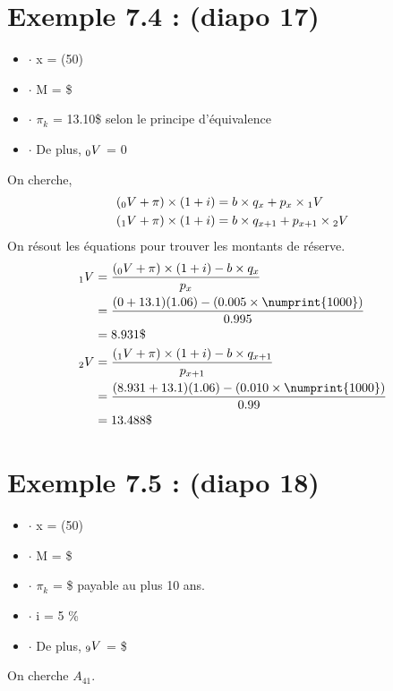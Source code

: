 \documentclass[11pt,french]{report}
\newcommand{\indiceGauche}[2]{{\vphantom{#2}}_{#1}#2}
\begin{document}
\section{Exemple 7.4 : (diapo 17)}
\begin{itemize}
\item $ \cdot $ x = (50)
\item $ \cdot $ M = \$
\item $ \cdot $ $\pi_k$ = 13.10\$ selon le principe d'équivalence 
\item $ \cdot $ De plus, $\indiceGauche{0}{V}$ = 0
\end{itemize}
On cherche,
\begin{align*}
(\indiceGauche{0}{V} + \pi )\times (1+i) &=  b\times q_{x} + p_{x}\times \indiceGauche{1}{V}\\
(\indiceGauche{1}{V} + \pi )\times (1+i) &=  b\times q_{x+1} + p_{x+1}\times \indiceGauche{2}{V}\\
\end{align*}
On résout les équations pour trouver les montants de réserve.
\begin{align*}
\indiceGauche{1}{V} &= \frac{(\indiceGauche{0}{V} + \pi )\times (1+i) - b\times q_{x}}{p_{x}}\\
&= \frac{(0 + 13.1)(1.06) - (0.005 \times \numprint{1000})}{0.995}\\
&= 8.931\$ \\
\indiceGauche{2}{V} &= \frac{(\indiceGauche{1}{V} + \pi )\times (1+i) - b\times q_{x+1}}{p_{x+1}}\\
&= \frac{(8.931 + 13.1)(1.06) - (0.010 \times \numprint{1000})}{0.99}\\
&= 13.488\$
\end{align*}

\section{Exemple 7.5 : (diapo 18)}
\begin{itemize}
\item $ \cdot $ x = (50)
\item $ \cdot $ M = \$
\item $ \cdot $ $\pi_k$ = \$ payable au plus 10 ans.
\item $ \cdot $ i = 5 \%
\item $ \cdot $ De plus, $\indiceGauche{9}{V}$ = \$
\end{itemize}
On cherche $A_{41}$. 
\end{document}
